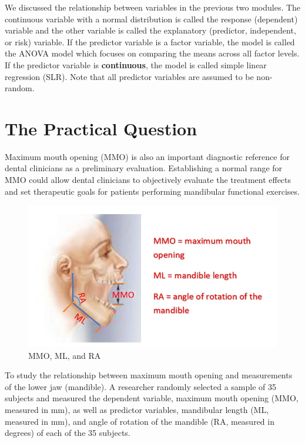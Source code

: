 \documentclass[
]{book}
\begin{document}
We discussed the relationship between variables in the previous two modules. The continuous variable with a normal distribution is called the response (dependent) variable and the other variable is called the explanatory (predictor, independent, or risk) variable. If the predictor variable is a factor variable, the model is called the ANOVA model which focuses on comparing the means across all factor levels. If the predictor variable is \textbf{continuous}, the model is called simple linear regression (SLR). Note that all predictor variables are assumed to be non-random.

\hypertarget{the-practical-question}{%
\section{The Practical Question}\label{the-practical-question}}

Maximum mouth opening (MMO) is also an important diagnostic reference for dental clinicians as a preliminary evaluation. Establishing a normal range for MMO could allow dental clinicians to objectively evaluate the treatment effects and set therapeutic goals for patients performing mandibular functional exercises.

\begin{figure}

{\centering \includegraphics[width=0.8\linewidth]{img04/w04-MMO} 

}

\caption{MMO, ML, and RA}\label{fig:unnamed-chunk-74}
\end{figure}

To study the relationship between maximum mouth opening and measurements of the lower jaw (mandible). A researcher randomly selected a sample of 35 subjects and measured the dependent variable, maximum mouth opening (MMO, measured in mm), as well as predictor variables, mandibular length (ML, measured in mm), and angle of rotation of the mandible (RA, measured in degrees) of each of the 35 subjects.
\end{document}
